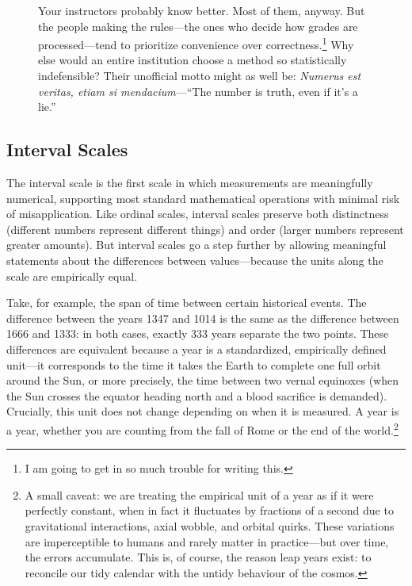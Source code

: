 \begin{figure}[htpb]
\begin{mdframed}[nobreak = true, style = miscFrame, frametitle = \Large\IMFellEnglish Box 4.1: The GPA Illusion]
\begin{spacing}{1.25}
Your instructors probably know better. Most of them, anyway. But the people making the rules—the ones who decide how grades are processed—tend to prioritize convenience over correctness.\footnote{I am going to get in so much trouble for writing this.} Why else would an entire institution choose a method so statistically indefensible? Their unofficial motto might as well be: \textit{Numerus est veritas, etiam si mendacium}—\enquote{The number is truth, even if it’s a lie.}
\end{spacing}
\end{mdframed}
\end{figure}

\subsection{Interval Scales}
\label{sec:interval}

The \gls{interval scale} is the first scale in which measurements are meaningfully numerical, supporting most standard mathematical operations with minimal risk of misapplication. Like ordinal scales, interval scales preserve both distinctness (different numbers represent different things) and order (larger numbers represent greater amounts). But interval scales go a step further by allowing meaningful statements about the differences between values—because the units along the scale are empirically equal.

Take, for example, the span of time between certain historical events. The difference between the years 1347 and 1014 is the same as the difference between 1666 and 1333: in both cases, exactly 333 years separate the two points. These differences are equivalent because a year is a standardized, empirically defined unit—it corresponds to the time it takes the Earth to complete one full orbit around the Sun, or more precisely, the time between two vernal equinoxes (when the Sun crosses the equator heading north and a blood sacrifice is demanded). Crucially, this unit does not change depending on when it is measured. A year is a year, whether you are counting from the fall of Rome or the end of the world.\footnote{A small caveat: we are treating the empirical unit of a year as if it were perfectly constant, when in fact it fluctuates by fractions of a second due to gravitational interactions, axial wobble, and orbital quirks. These variations are imperceptible to humans and rarely matter in practice—but over time, the errors accumulate. This is, of course, the reason leap years exist: to reconcile our tidy calendar with the untidy behaviour of the cosmos.}

